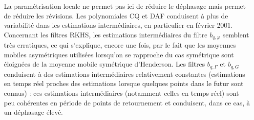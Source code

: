 \documentclass[
  12pt,
  a4paper,french]{article}
\newcommand\1{\mathds{1}}
\begin{document}
La paramétrisation locale ne permet pas ici de réduire le déphasage mais permet de réduire les révisions.
Les polynomiales CQ et DAF conduisent à plus de variabilité dans les estimations intermédiaires, en particulier en février 2001.
Concernant les filtres RKHS, les estimations intermédiaires du filtre \(b_{q,\varphi}\) semblent très erratiques, ce qui s'explique, encore une fois, par le fait que les moyennes mobiles asymétriques utilisées lorsqu'on se rapproche du cas symétrique sont éloignées de la moyenne mobile symétrique d'Henderson.
Les filtres \(b_{q,\Gamma}\) et \(b_{q,G}\) conduisent à des estimations intermédiaires relativement constantes (estimations en temps réel proches des estimations lorsque quelques points dans le futur sont connus) : ces estimations intermédiaires (notamment celles en temps-réel) sont peu cohérentes en période de points de retournement et conduisent, dans ce cas, à un déphasage élevé.
\end{document}
